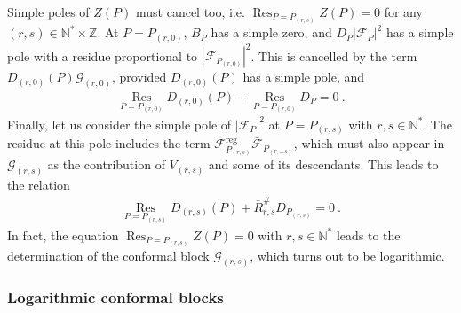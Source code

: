 \documentclass[12pt, a4paper]{article}
\begin{document}
Simple poles of $Z(P)$ must cancel too, i.e. $\operatorname{Res}_{P=P_{(r,s)}}Z(P)=0$ for any $(r,s)\in \mathbb{N}^*\times\mathbb{Z}$. At $P=P_{(r,0)}$, $B_P$ has a simple zero, and $D_P\left|\mathcal{F}_P\right|^2$ has a simple pole with a residue proportional to $\left|\mathcal{F}_{P_{(r,0)}}\right|^2$. This is  cancelled by the term $D_{(r,0)}(P) \mathcal{G}_{(r,0)}$, provided $D_{(r,0)}(P)$ has a simple pole, and 
\begin{align}
  \underset{P=P_{(r,0)}}{\operatorname{Res}} D_{(r,0)}(P) + \underset{P=P_{(r,0)}}{\operatorname{Res}}D_P = 0 \ .
\end{align}
Finally, let us consider the simple pole of $\left|\mathcal{F}_{P}\right|^2$ at $P=P_{(r,s)}$ with $r,s\in \mathbb{N}^*$. The residue at this pole includes the term 
$\mathcal{F}_{P_{(r,s)}}^\text{reg}\bar{\mathcal{F}}_{P_{(r,-s)}}$, which must also appear in $\mathcal{G}_{(r,s)}$ as the contribution of $V_{(r,s)}$ and some of its descendants. This leads to the relation
\begin{align}
 \underset{P=P_{(r,s)}}{\operatorname{Res}} D_{(r,s)}(P) + \bar R^{\#}_{r,s} D_{P_{(r,s)}} = 0\ .
 \label{rdp}
\end{align}
In fact, the equation $\operatorname{Res}_{P=P_{(r,s)}}Z(P)=0$ with $r,s\in \mathbb{N}^*$ leads to the determination of the conformal block $\mathcal{G}_{(r,s)}$, which turns out to be logarithmic. 

\subsubsection{Logarithmic conformal blocks}\label{sec:log}
\end{document}
